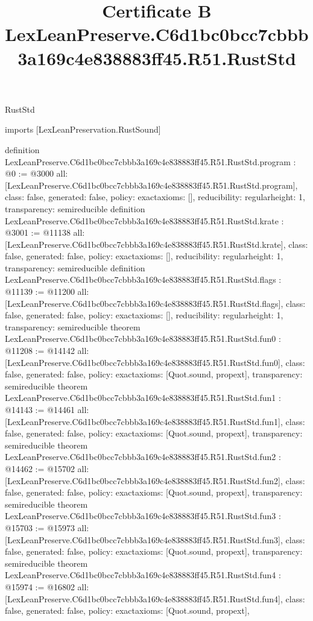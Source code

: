 \begin{lexlean}{RustStd}
\title{Certificate B LexLeanPreserve.C6d1bc0bcc7cbbb3a169c4e838883ff45.R51.RustStd}
\begin{coremodule}
imports [LexLeanPreservation.RustSound]

definition LexLeanPreserve.C6d1bc0bcc7cbbb3a169c4e838883ff45.R51.RustStd.program : @0 := @3000 {
  all: [LexLeanPreserve.C6d1bc0bcc7cbbb3a169c4e838883ff45.R51.RustStd.program],
  class: false,
  generated: false,
  policy: exact{axioms: []},
  reducibility: regular{height: 1},
  transparency: semireducible
}
definition LexLeanPreserve.C6d1bc0bcc7cbbb3a169c4e838883ff45.R51.RustStd.krate : @3001 := @11138 {
  all: [LexLeanPreserve.C6d1bc0bcc7cbbb3a169c4e838883ff45.R51.RustStd.krate],
  class: false,
  generated: false,
  policy: exact{axioms: []},
  reducibility: regular{height: 1},
  transparency: semireducible
}
definition LexLeanPreserve.C6d1bc0bcc7cbbb3a169c4e838883ff45.R51.RustStd.flags : @11139 := @11200 {
  all: [LexLeanPreserve.C6d1bc0bcc7cbbb3a169c4e838883ff45.R51.RustStd.flags],
  class: false,
  generated: false,
  policy: exact{axioms: []},
  reducibility: regular{height: 1},
  transparency: semireducible
}
theorem LexLeanPreserve.C6d1bc0bcc7cbbb3a169c4e838883ff45.R51.RustStd.fun0 : @11208 := @14142 {
  all: [LexLeanPreserve.C6d1bc0bcc7cbbb3a169c4e838883ff45.R51.RustStd.fun0],
  class: false,
  generated: false,
  policy: exact{axioms: [Quot.sound, propext]},
  transparency: semireducible
}
theorem LexLeanPreserve.C6d1bc0bcc7cbbb3a169c4e838883ff45.R51.RustStd.fun1 : @14143 := @14461 {
  all: [LexLeanPreserve.C6d1bc0bcc7cbbb3a169c4e838883ff45.R51.RustStd.fun1],
  class: false,
  generated: false,
  policy: exact{axioms: [Quot.sound, propext]},
  transparency: semireducible
}
theorem LexLeanPreserve.C6d1bc0bcc7cbbb3a169c4e838883ff45.R51.RustStd.fun2 : @14462 := @15702 {
  all: [LexLeanPreserve.C6d1bc0bcc7cbbb3a169c4e838883ff45.R51.RustStd.fun2],
  class: false,
  generated: false,
  policy: exact{axioms: [Quot.sound, propext]},
  transparency: semireducible
}
theorem LexLeanPreserve.C6d1bc0bcc7cbbb3a169c4e838883ff45.R51.RustStd.fun3 : @15703 := @15973 {
  all: [LexLeanPreserve.C6d1bc0bcc7cbbb3a169c4e838883ff45.R51.RustStd.fun3],
  class: false,
  generated: false,
  policy: exact{axioms: [Quot.sound, propext]},
  transparency: semireducible
}
theorem LexLeanPreserve.C6d1bc0bcc7cbbb3a169c4e838883ff45.R51.RustStd.fun4 : @15974 := @16802 {
  all: [LexLeanPreserve.C6d1bc0bcc7cbbb3a169c4e838883ff45.R51.RustStd.fun4],
  class: false,
  generated: false,
  policy: exact{axioms: [Quot.sound, propext]},
}
\end{coremodule}
\end{lexlean}
